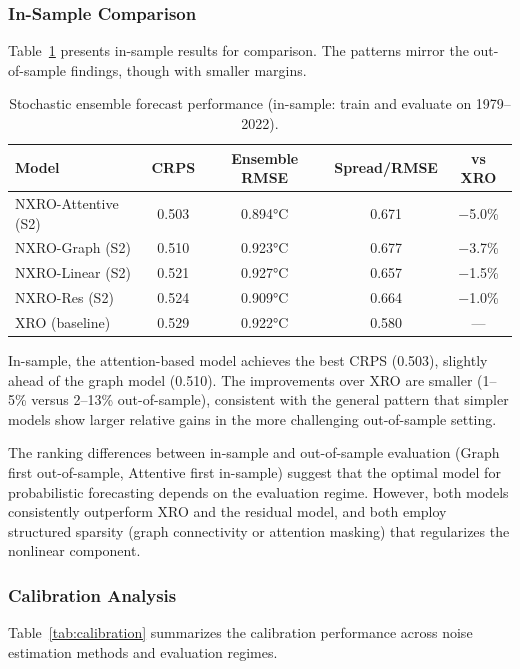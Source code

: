\subsubsection{In-Sample Comparison}

Table~\ref{tab:stochastic_insample} presents in-sample results for comparison. The patterns mirror the out-of-sample findings, though with smaller margins.

\begin{table}[htbp]
\centering
\caption{Stochastic ensemble forecast performance (in-sample: train and evaluate on 1979--2022).}
\label{tab:stochastic_insample}
\begin{tabular}{lcccc}
\toprule
\textbf{Model} & \textbf{CRPS} & \textbf{Ensemble RMSE} & \textbf{Spread/RMSE} & \textbf{vs XRO} \\
\midrule
NXRO-Attentive (S2) & 0.503 & 0.894°C & 0.671 & $-$5.0\% \\
NXRO-Graph (S2) & 0.510 & 0.923°C & 0.677 & $-$3.7\% \\
NXRO-Linear (S2) & 0.521 & 0.927°C & 0.657 & $-$1.5\% \\
NXRO-Res (S2) & 0.524 & 0.909°C & 0.664 & $-$1.0\% \\
XRO (baseline) & 0.529 & 0.922°C & 0.580 & --- \\
\bottomrule
\end{tabular}
\end{table}

In-sample, the attention-based model achieves the best CRPS (0.503), slightly ahead of the graph model (0.510). The improvements over XRO are smaller (1--5\% versus 2--13\% out-of-sample), consistent with the general pattern that simpler models show larger relative gains in the more challenging out-of-sample setting.

The ranking differences between in-sample and out-of-sample evaluation (Graph first out-of-sample, Attentive first in-sample) suggest that the optimal model for probabilistic forecasting depends on the evaluation regime. However, both models consistently outperform XRO and the residual model, and both employ structured sparsity (graph connectivity or attention masking) that regularizes the nonlinear component.

\subsubsection{Calibration Analysis}

Table~\ref{tab:calibration} summarizes the calibration performance across noise estimation methods and evaluation regimes.

